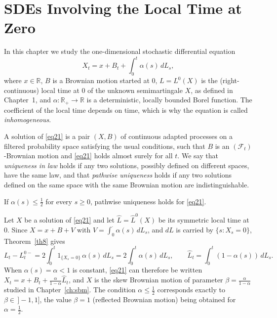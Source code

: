 \chapter{SDEs Involving the Local Time at Zero}

In this chapter we study the one-dimensional stochastic differential equation
\begin{equation}\label{eq21}
	X_t = x+ B_t + \int_0^t \alpha(s)\,dL_s ,
\end{equation}
where $x\in\mathbb{R}$, $B$ is a Brownian motion started at $0$,
$L = L^0(X)$ is the (right-continuous) local time at $0$ of the unknown
semimartingale $X$, as defined in Chapter~1, and
$\alpha : \mathbb{R}_+ \to \mathbb{R}$ is a deterministic, locally bounded Borel
function. The coefficient of the local time depends on time, which is why the
equation is called \emph{inhomogeneous}.

A solution of \eqref{eq21} is a pair $(X,B)$ of continuous adapted processes on
a filtered probability space satisfying the usual conditions, such that $B$ is
an $(\mathcal{F}_t)$-Brownian motion and \eqref{eq21} holds almost surely for
all $t$. We say that \emph{uniqueness in law} holds if any two solutions, possibly
defined on different spaces, have the same law, and that \emph{pathwise
uniqueness} holds if any two solutions defined on the same space with the same
Brownian motion are indistinguishable.

\begin{theorem}\label{th21}
	If $\alpha(s)\leqslant \frac{1}{2}$ for every $s\geqslant 0$, pathwise
	uniqueness holds for \eqref{eq21}.
\end{theorem}

\begin{remark}\label{rem:alpha-sbm}
	Let $X$ be a solution of \eqref{eq21} and let $\hat{L} = \hat{L}^0(X)$ be its
	symmetric local time at $0$. Since $X = x + B + V$ with
	$V = \int_0^\cdot \alpha(s)\,dL_s$, and $dL$ is carried by $\{s : X_s = 0\}$,
	Theorem~\ref{th8} gives
	\begin{equation}\label{eq:jump21}
		L_t - L^{0-}_t = 2\int_0^t 1_{\{X_s = 0\}}\,\alpha(s)\,dL_s = 2\int_0^t\alpha(s)\,dL_s,
		\qquad
		\hat{L}_t = \int_0^t (1-\alpha(s))\,dL_s .
	\end{equation}
	When $\alpha(s)=\alpha<1$ is constant, \eqref{eq21} can therefore be written
	$X_t = x + B_t + \frac{\alpha}{1-\alpha}\hat{L}_t$, and $X$ is the skew
	Brownian motion of parameter $\beta = \frac{\alpha}{1-\alpha}$ studied in
	Chapter~\ref{ch:sbm}. The condition $\alpha\leqslant \frac{1}{2}$ corresponds
	exactly to $\beta \in \,]-1,1]$, the value $\beta = 1$ (reflected Brownian
	motion) being obtained for $\alpha = \frac{1}{2}$.
\end{remark}

